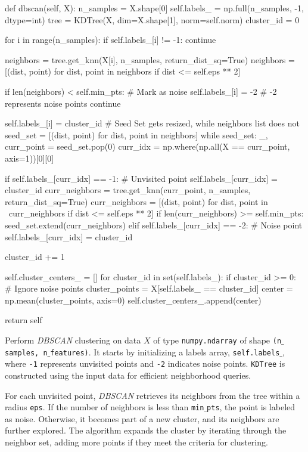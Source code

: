 \documentclass{article}
\begin{document}
	\begin{python}
def dbscan(self, X):
	n_samples = X.shape[0]
	self.labels_ = np.full(n_samples, -1, dtype=int)
	tree = KDTree(X, dim=X.shape[1], norm=self.norm)
	cluster_id = 0
	
	for i in range(n_samples):
		if self.labels_[i] != -1:
			continue
		
		neighbors = tree.get_knn(X[i], n_samples, return_dist_sq=True)
		neighbors = [(dist, point) for dist, point in neighbors if dist <= self.eps ** 2]
		
		if len(neighbors) < self.min_pts:  # Mark as noise
			self.labels_[i] = -2  # -2 represents noise points
			continue
		
		self.labels_[i] = cluster_id
		# Seed Set gets resized, while neighbors list does not
		seed_set = [(dist, point) for dist, point in neighbors]
		while seed_set:
			_, curr_point = seed_set.pop(0)
			curr_idx = np.where(np.all(X == curr_point, axis=1))[0][0]
		
			if self.labels_[curr_idx] == -1:  # Unvisited point
				self.labels_[curr_idx] = cluster_id
				curr_neighbors = tree.get_knn(curr_point, n_samples, return_dist_sq=True)
				curr_neighbors = [(dist, point) for dist, point in \
					curr_neighbors if dist <= self.eps ** 2]
				if len(curr_neighbors) >= self.min_pts:
					seed_set.extend(curr_neighbors)	
			elif self.labels_[curr_idx] == -2:  # Noise point
				self.labels_[curr_idx] = cluster_id
		
		cluster_id += 1
	
	self.cluster_centers_ = []
	for cluster_id in set(self.labels_):
		if cluster_id >= 0:  # Ignore noise points
			cluster_points = X[self.labels_ == cluster_id]
			center = np.mean(cluster_points, axis=0)
			self.cluster_centers_.append(center)
	
	return self\end{python}
	
	Perform \textit{DBSCAN} clustering on data $X$ of type \texttt{numpy.ndarray} of shape \texttt{(n$\_$samples, n$\_$features)}.  It starts by initializing a labels array, \texttt{self.labels$\_$}, where \texttt{-1} represents unvisited points and \texttt{-2} indicates noise points. \texttt{KDTree} is constructed using the input data for efficient neighborhood queries.
	
	For each unvisited point, \textit{DBSCAN} retrieves its neighbors from the tree within a radius \texttt{eps}. If the number of neighbors is less than \texttt{min$\_$pts}, the point is labeled as noise. Otherwise, it becomes part of a new cluster, and its neighbors are further explored. The algorithm expands the cluster by iterating through the neighbor set, adding more points if they meet the criteria for clustering.
	
\end{document}
